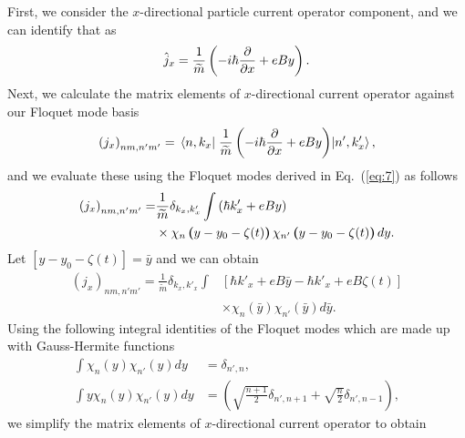 \documentclass[
 reprint,
 amsmath,amssymb,
 aps,
 prb,
]{revtex4-2}
\begin{document}
\begin{appendix}
First, we consider the $x$-directional particle current operator component, and we can identify that as
\begin{equation} \label{eq:d4}
  \hat{j}_x = \frac{1}{\widetilde{m}} \left(-i\hbar\pdv{x} + eBy \right).
\end{equation}
Next, we calculate the matrix elements of $x$-directional current operator against our Floquet mode basis
\begin{equation} \label{eq:d5}
  \left({j}_x \right)_{nm,n'm'} =
  \mel{n,k_x}{\;\frac{1}{\widetilde{m}} \left(-i\hbar\pdv{x} + eBy \right)}{n',k'_x},
\end{equation}
and we evaluate these using the Floquet modes derived in Eq.~(\ref{eq:7}) as follows
\begin{equation} \label{eq:d6}
  \begin{aligned}
    \left({j}_x \right)_{nm,n'm'} = &
    \frac{1}{{\widetilde{m}}}
    \delta_{k_x,k'_x}
    \int
    \left(\hbar k'_x + eBy\right) \\
    & \times
     \chi_{n}\bm{\left(}y - y_0 - \zeta(t)\bm{\right)}
    \chi_{n'}\bm{\left(}y - y_0 - \zeta(t)\bm{\right)}
    dy.
  \end{aligned}
\end{equation}
Let $[y - y_0 - \zeta(t)] = \bar{y}$ and we can obtain
\begin{equation} \label{eq:d7}
  \begin{aligned}
    \left({j}_x \right)_{nm,n'm'} =
    \frac{1}{{\widetilde{m}}}
    \delta_{k_x,k'_x}
    \int &
    \left[ \hbar k'_x + eB\bar{y} -\hbar k'_x + eB\zeta(t)\right] \\
    & \times
    \chi_{n}(\bar{y})
    \chi_{n'}(\bar{y})
    d\bar{y}.
  \end{aligned}
\end{equation}
Using the following integral identities of the Floquet modes which are made up with Gauss-Hermite functions \cite{vedenyapin11,szego59}
\begin{subequations} \label{eq:d8}
  \begin{align}
    \int
    \chi_{n}({y})
    \chi_{n'}({y}) d{y} &=
    \delta_{n',n}, \\
    \int
    y \chi_{n}({y})\chi_{n'}({y}) d{y} &=
    \left(\sqrt{\frac{n+1}{2}} \delta_{n',n+1} + \sqrt{\frac{n}{2}}
    \delta_{n',n-1} \right),
  \end{align}
\end{subequations}
we simplify the matrix elements of $x$-directional current operator to obtain
\begin{equation} \label{eq:d9}

\end{equation}
\end{appendix}
\end{document}
